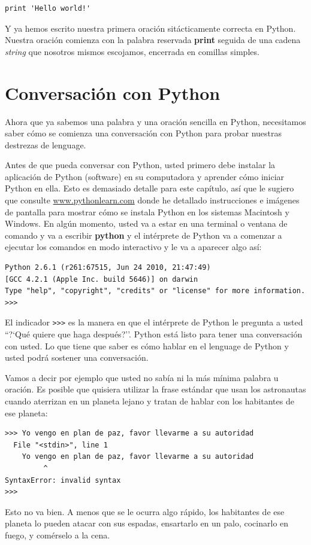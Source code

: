 \beforeverb
\begin{verbatim}
print 'Hello world!'
\end{verbatim}
\afterverb

Y ya hemos escrito nuestra primera oraci\'on sit\'acticamente correcta en Python.
Nuestra oraci\'on comienza con la palabra reservada {\bf print} seguida de una cadena \textit{string} que nosotros mismos escojamos, encerrada en comillas simples.

\section{Conversaci\'on con Python}

Ahora que ya sabemos una palabra y una oraci\'on sencilla  en Python,
necesitamos saber c\'omo se comienza una conversaci\'on con Python para probar 
nuestras destrezas de lenguage.

Antes de que pueda conversar con Python, usted primero debe instalar la aplicaci\'on de Python
(software) en su computadora y aprender c\'omo iniciar Python en ella. Esto es demasiado detalle para este cap\'itulo, as\'i que le sugiero que consulte \url{www.pythonlearn.com} donde he detallado instrucciones e im\'agenes de pantalla para mostrar c\'omo se instala Python 
en los sistemas Macintosh y Windows. En alg\'un momento, usted va a estar en 
una terminal o ventana de comando y va a escribir {\bf python} y el int\'erprete 
de Python va a comenzar a ejecutar los comandos en modo interactivo 
y le va a aparecer algo as\'i:

\beforeverb
\begin{verbatim}
Python 2.6.1 (r261:67515, Jun 24 2010, 21:47:49) 
[GCC 4.2.1 (Apple Inc. build 5646)] on darwin
Type "help", "copyright", "credits" or "license" for more information.
>>> 
\end{verbatim}
\afterverb
%
El indicador {\tt >>>} es la manera en que el int\'erprete de Python le pregunta a usted ``?`Qu\'e quiere que haga despu\'es?''. Python est\'a listo para tener una conversaci\'on con usted. Lo que tiene que saber es c\'omo hablar en el lenguage de Python y usted podr\'a sostener una conversaci\'on.

Vamos a decir por ejemplo que usted no sab\'ia ni la m\'as m\'inima palabra u oraci\'on. Es posible que quisiera utilizar la frase est\'andar que usan los astronautas cuando aterrizan en un planeta lejano y tratan de hablar con los habitantes de ese planeta:

\beforeverb
\begin{verbatim}
>>> Yo vengo en plan de paz, favor llevarme a su autoridad 
  File "<stdin>", line 1
    Yo vengo en plan de paz, favor llevarme a su autoridad
         ^
SyntaxError: invalid syntax
>>> 
\end{verbatim}
\afterverb
%
Esto no va bien. A menos que se le ocurra algo r\'apido, los habitantes de ese planeta lo pueden atacar con sus espadas, ensartarlo en un palo, cocinarlo en fuego, y com\'erselo a la cena.

